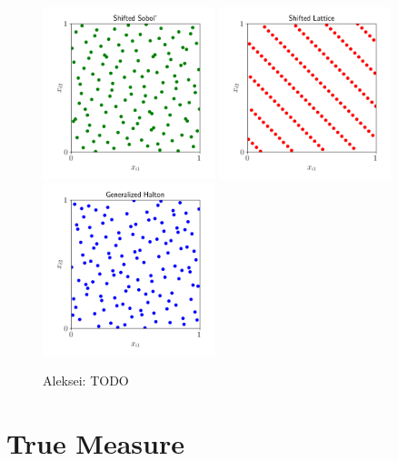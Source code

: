 \documentclass[graybox,footinfo]{svmult}
\newcommand{\AGSComment}[1]{{\color{cyan} Aleksei: #1}}
\begin{document}
\begin{figure}
	\includegraphics[height=5cm]{ags/figs/dd.sobol.png}
	\qquad
	\includegraphics[height=5cm]{ags/figs/dd.lattice.png}
	\qquad
	\includegraphics[height=5cm]{ags/figs/dd.halton.png}
	\caption{\AGSComment{TODO}}
	\label{fig:dd_ld}
\end{figure}

\section{True Measure}


\end{document}
